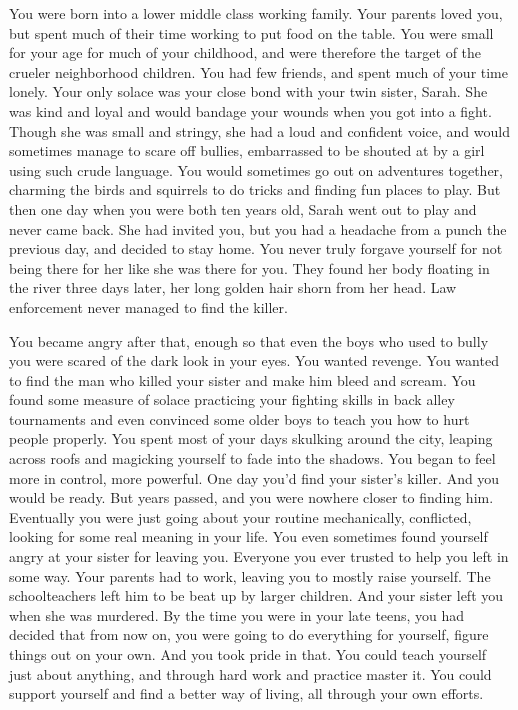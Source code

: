 \documentclass[char]{guildcamp3}
\begin{document}
\name{\cRogueOne{}}


You were born into a lower middle class working family. Your parents loved you, but spent much of their time working to put food on the table. You were small for your age for much of your childhood, and were therefore the target of the crueler neighborhood children. You had few friends, and spent much of your time lonely. Your only solace was your close bond with your twin sister, Sarah. She was kind and loyal and would bandage your wounds when you got into a fight. Though she was small and stringy, she had a loud and confident voice, and would sometimes manage to scare off bullies, embarrassed to be shouted at by a girl using such crude language. You would sometimes go out on adventures together, charming the birds and squirrels to do tricks and finding fun places to play. But then one day when you were both ten years old, Sarah went out to play and never came back. She had invited you, but you had a headache from a punch the previous day, and decided to stay home. You never truly forgave yourself for not being there for her like she was there for you. They found her body floating in the river three days later, her long golden hair shorn from her head. Law enforcement never managed to find the killer.

You became angry after that, enough so that even the boys who used to bully you were scared of the dark look in your eyes. You wanted revenge. You wanted to find the man who killed your sister and make him bleed and scream. You found some measure of solace practicing your fighting skills in back alley tournaments and even convinced some older boys to teach you how to hurt people properly. You spent most of your days skulking around the city, leaping across roofs and magicking yourself to fade into the shadows. You began to feel more in control, more powerful. One day you'd find your sister's killer. And you would be ready. But years passed, and you were nowhere closer to finding him. Eventually you were just going about your routine mechanically, conflicted, looking for some real meaning in your life. You even sometimes found yourself angry at your sister for leaving you. Everyone you ever trusted to help you left in some way. Your parents had to work, leaving you to mostly raise yourself. The schoolteachers left him to be beat up by larger children. And your sister left you when she was murdered. By the time you were in your late teens, you had decided that from now on, you were going to do everything for yourself, figure things out on your own. And you took pride in that. You could teach yourself just about anything, and through hard work and practice master it. You could support yourself and find a better way of living, all through your own efforts.
\end{document}
